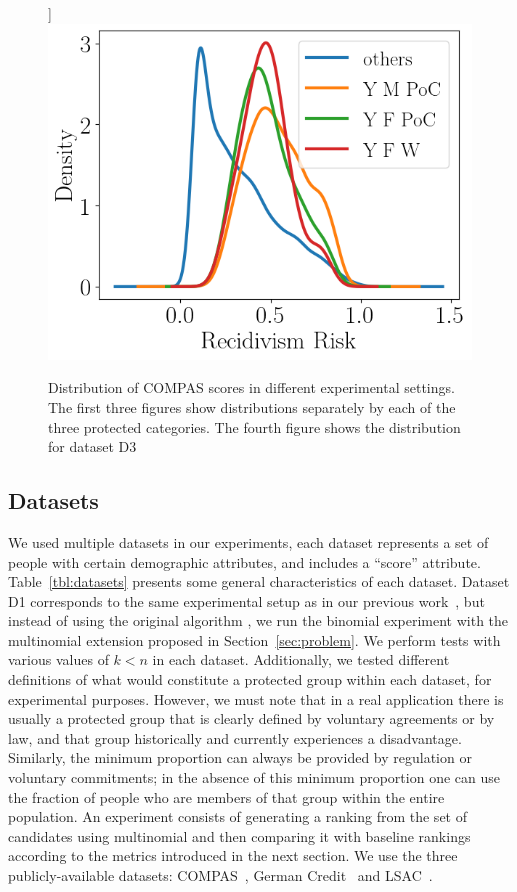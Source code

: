 \begin{figure}[t]
	\label{fig:dataset:compas:worstThree}]
	{\includegraphics[width=.48\textwidth]{pics/compas_worstThreeGroups_kde.png}}\hfill
	\vspace{-3mm}
	\caption{Distribution of COMPAS scores in different experimental settings. The first three figures show distributions separately by each of the three protected categories. The fourth figure shows the distribution for dataset D3}
	\label{fig:dataset:compas}
\end{figure}

\subsection{Datasets}\label{sec:experiments-datasets}

We used multiple datasets in our experiments, each dataset represents a set of people with certain demographic attributes, and includes a ``score'' attribute.
%
Table~\ref{tbl:datasets} presents some general characteristics of each dataset.
%
Dataset D1 corresponds to the same experimental setup as in our previous work~\cite{zehlike2017fair}, but instead of using the original algorithm \algoFAIR, we run the binomial experiment with the multinomial extension proposed in Section~\ref{sec:problem}.
%
We perform tests with various values of $k<n$ in each dataset.
%
Additionally, we tested different definitions of what would constitute a protected group within each dataset, for experimental purposes.
%
However, we must note that in a real application there is usually a protected group that is clearly defined by voluntary agreements or by law, and that group historically and currently experiences a disadvantage.
%
Similarly, the minimum proportion can always be provided by regulation or voluntary commitments; in the absence of this minimum proportion one can use the fraction of people who are members of that group within the entire population.
%
An experiment consists of generating a ranking from the set of candidates using multinomial \algoFAIR and then comparing it with baseline rankings according to the metrics introduced in the next section.
%
We use the three publicly-available datasets: COMPAS~\cite{angwin_2016_machine}, German Credit~\cite{lichman_2013_uci} and LSAC~\cite{wightman1998lsac}.

